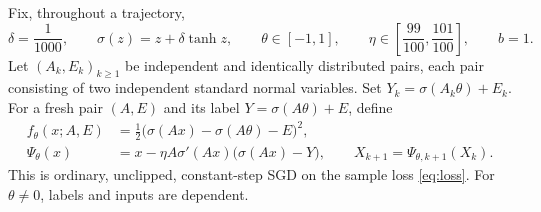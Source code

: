 \documentclass[11pt,a4paper]{article}
\numberwithin{equation}{section}
\theoremstyle{remark}
\begin{document}
Fix, throughout a trajectory,
\begin{equation}
\delta=\frac1{1000},\qquad \sigma(z)=z+\delta\tanh z,\qquad
\theta\in[-1,1],\qquad \eta\in\left[\frac{99}{100},\frac{101}{100}\right],
\qquad b=1.\label{eq:model-parameters}
\end{equation}
Let $(A_k,E_k)_{k\geq1}$ be independent and identically distributed pairs,
each pair consisting of two independent standard normal variables. Set
$Y_k=\sigma(A_k\theta)+E_k$. For a fresh pair $(A,E)$ and its label
$Y=\sigma(A\theta)+E$, define
\begin{align}
 f_\theta(x;A,E)&=\frac12\bigl(\sigma(Ax)-\sigma(A\theta)-E\bigr)^2,
 \label{eq:loss}\\
 \Psi_\theta(x)&=x-\eta A\sigma'(Ax)\bigl(\sigma(Ax)-Y\bigr),
 \qquad X_{k+1}=\Psi_{\theta,k+1}(X_k).\label{eq:update}
\end{align}
This is ordinary, unclipped, constant-step SGD on the sample loss
\eqref{eq:loss}. For $\theta\ne0$, labels and inputs are dependent.
\end{document}
